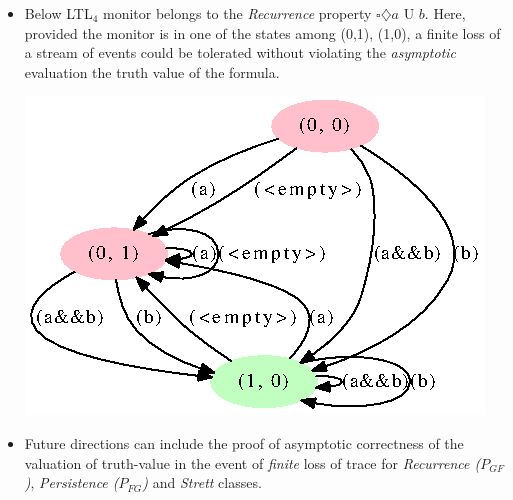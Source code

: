 \documentclass[]{article}
\begin{document}
\begin{itemize}
    \item Below LTL$_4$ monitor belongs to the \emph{Recurrence} property $\square \diamondsuit  a$ U $b$. Here, provided the monitor is in one of the states among (0,1), (1,0), a finite loss of a stream of events could be tolerated without violating the \emph{asymptotic} evaluation the truth value of the formula. 
    
    \includegraphics[scale=0.6]{GFExample.png}
    
    \item Future directions can include the proof of asymptotic correctness of the valuation of truth-value in the event of \emph{finite} loss of trace for  \emph{Recurrence ($P_{GF}$)}, \emph{Persistence ($P_{FG}$)} and \emph{Strett} classes.
    
    \end{itemize}
\end{document}
